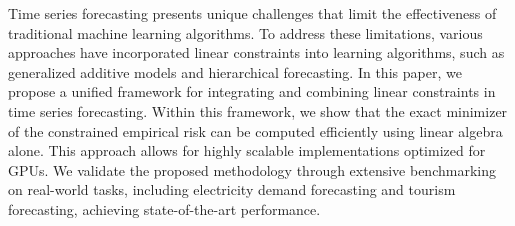 Time series forecasting presents unique challenges that limit the effectiveness of traditional machine learning algorithms. To address these limitations, various approaches have incorporated linear constraints into learning algorithms, such as generalized additive models and hierarchical forecasting. In this paper, we propose a unified framework for integrating and combining linear constraints in time series forecasting. Within this framework, we show that the exact minimizer of the constrained empirical risk can be computed efficiently using linear algebra alone. This approach allows for highly scalable implementations optimized for GPUs. We validate the proposed methodology through extensive benchmarking on real-world tasks, including electricity demand forecasting and tourism forecasting, achieving state-of-the-art performance. 